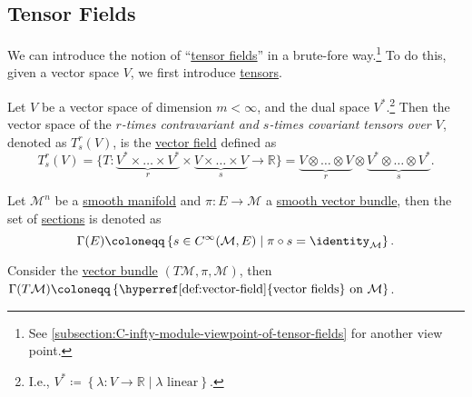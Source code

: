 \subsection{Tensor Fields}
We can introduce the notion of ``\hyperref[def:tensor-field]{tensor fields}'' in a brute-fore way.\footnote{See \autoref{subsection:C-infty-module-viewpoint-of-tensor-fields} for another view point.} To do this, given a vector space \(V\), we first introduce \hyperref[def:tensor]{tensors}.

\begin{definition}[Tensor]\label{def:tensor}
	Let \(V\) be a vector space of dimension \(m < \infty \), and the dual space \(V^{\ast}\).\footnote{I.e., \(V^{\ast} \coloneqq \left\{ \lambda \colon V \to \mathbb{R} \mid \lambda \text{ linear} \right\} \).} Then the vector space of the \emph{\(r\)-times contravariant and \(s\)-times covariant tensors over \(V\)}, denoted as \(T_s^r(V) \), is the \hyperref[def:vector-field]{vector field} defined as
	\[
		T_s^r(V) = \{ T\colon \underbrace{V^{\ast} \times \ldots \times V^{\ast} }_{r} \times \underbrace{V\times \ldots \times V}_{s} \to \mathbb{R} \}
		= \underbrace{V \otimes \ldots \otimes V}_{r} \otimes \underbrace{V^{\ast} \otimes \ldots \otimes V^{\ast} }_{s}.
	\]
\end{definition}

\begin{notation}
	Let \(\mathcal{M} ^n \) be a \hyperref[def:smooth-manifold]{smooth manifold} and \(\pi \colon E \to \mathcal{M} \) a \hyperref[def:vector-bundle]{smooth vector bundle}, then the set of \hyperref[def:section]{sections} is denoted as
	\[
		\Gamma (E) \coloneqq \left\{ s\in C^{\infty} (\mathcal{M} , E) \mid \pi \circ s = \identity_{\mathcal{M} } \right\}.
	\]
\end{notation}

\begin{eg}
	Consider the \hyperref[def:vector-bundle]{vector bundle} \((T\mathcal{M} , \pi , \mathcal{M} )\), then \(\Gamma (T\mathcal{M} ) \coloneqq \left\{ \text{\hyperref[def:vector-field]{vector fields} on } \mathcal{M} \right\} \).
\end{eg}


